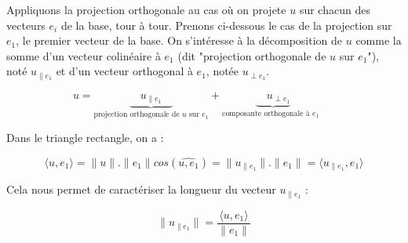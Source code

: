 Appliquons la projection orthogonale au cas où on projete $u$ sur chacun des vecteurs $e_i$ de la base, tour à tour. Prenons ci-dessous le cas de la projection sur $e_1$, le premier vecteur de la base. On s'intéresse à la décomposition de $u$ comme la somme d'un vecteur colinéaire à $e_1$ (dit "projection orthogonale de $u$ sur $e_1$"), noté $u_{\| e_1}$ et d'un vecteur orthogonal à $e_1$, notée $u_{\perp e_1}$.

\begin{equation}
u = \underbrace{\quad u_{\| e_1} \quad}_{\text{projection orthogonale de $u$ sur $e_1$}} + \underbrace{\quad u_{\perp e_1}}_{\text{composante orthogonale à $e_1$ }} \quad
\end{equation}

\begin{center} 
\end{center} 

Dans le triangle rectangle, on a :

\begin{equation}
\langle u , e_1 \rangle   = \|u\|.\|e_1\|cos(\widehat{u,e_1})  =  \|u_{\|e_1}\|.\|e_1\| = \langle u_{\|e_1},e_1 \rangle
\end{equation}


Cela nous permet de caractériser la longueur du vecteur $u_{\|e_1}$ : 

\begin{equation}
\|u_{\|e_1}\|  = \frac{\langle u , e_1 \rangle}{\|e_1\|}
\end{equation}

